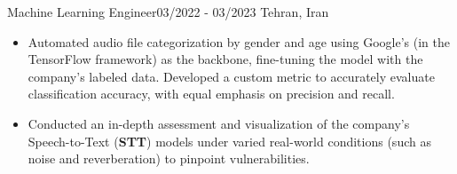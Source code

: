 \resumeSubheadingReza
{Machine Learning Engineer}{03/2022 - 03/2023}
{}{Tehran, Iran}
{
  \vspace{-12pt}
  \begin{itemize}
    \item {Automated audio file categorization by gender and age using Google's  (in the TensorFlow framework) as the backbone, fine-tuning the model with the company's labeled data. Developed a custom metric to accurately evaluate classification accuracy, with equal emphasis on precision and recall.}
    \item {Conducted an in-depth assessment and visualization of the company's Speech-to-Text (\textbf{STT}) models under varied real-world conditions (such as noise and reverberation) to pinpoint vulnerabilities.}
  \end{itemize}
}

